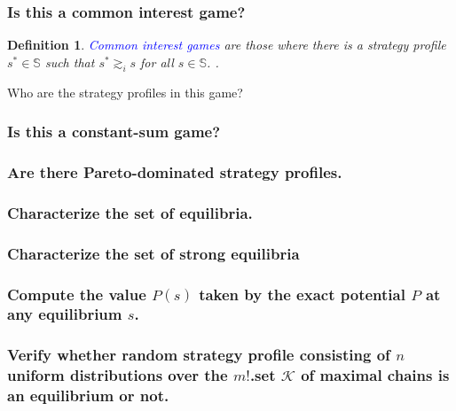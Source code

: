 \documentclass{article}
\newtheorem{defn}{Definition}
\begin{document}
\subsubsection{Is this a common interest game?}
\begin{defn}
	\textcolor{blue}{Common interest games} are those where there is a strategy profile $s^* \in \mathbb{S}$ such that $s^* \gtrsim_i s$ for all $s \in \mathbb{S}$. \cite{rossi01}.
\end{defn}

Who are the strategy profiles in this game?

\subsubsection{Is this a constant-sum game?}

\subsubsection{Are there Pareto-dominated strategy profiles.}

\subsubsection{Characterize the set of equilibria.}

\subsubsection{Characterize the set of strong equilibria}

\subsubsection{Compute the value $P(s)$ taken by the exact potential $P$ at any equilibrium $s$.}

\subsubsection{Verify whether random strategy profile consisting of $n$ uniform distributions over the $m!$.set $\mathcal{K}$ of maximal chains is an equilibrium or not.}

\end{document}
